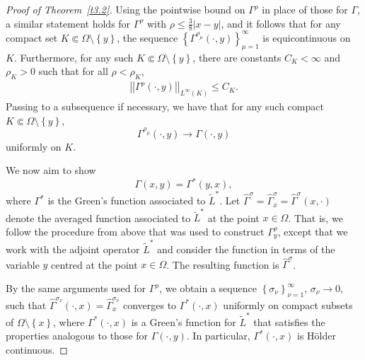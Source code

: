 \documentclass[12pt,reqno]{amsart}
\theoremstyle{plain}
\theoremstyle{definition}
\newenvironment{pf}
{\begin{proof}} {\end{proof}}
\newcommand{\Ga}{\Gamma}
\newcommand{\Om}{\Omega}
\newcommand{\si}{\sigma}
\newcommand{\iny}{\infty}
\newcommand{\norm}[1]{\left\vert \left\vert #1\right\vert\right\vert}
\newcommand{\set}[1]{\left\{#1\right\}}
\newcommand{\pr}[1]{\left( #1 \right) }
\begin{document}
\begin{appendix}
\begin{pf}[Proof of Theorem~\ref{t3.2}]
Using the pointwise bound on $\Ga^\rho$ in place of those for $\Ga$, a similar statement holds for $\Ga^\rho$ with $\rho\leq \frac 38 |x-y|$, and it follows that for any compact set $K \Subset \Om\setminus\set{y}$, the sequence $\set{\Ga^{\rho_\mu}\pr{\cdot, y}}_{\mu = 1}^\iny$ is equicontinuous on $K$.
Furthermore, for any such $K \Subset \Om\setminus\set{y}$, there are constants 
$C_K < \iny$ and $\rho_K > 0$ such that for all $\rho < \rho_K$,
\begin{align*}
\norm{\Ga^{\rho}\pr{\cdot, y}}_{L^\infty\pr{K}} \le C_K.
\end{align*}
Passing to a subsequence if necessary, we have that for any such compact $K 
\Subset \Om\setminus\set{y}$,
\begin{equation}
\Ga^{\rho_\mu}(\cdot, y) \to \Ga\pr{\cdot,  y}
\label{eqB.58}
\end{equation}
uniformly on $K$.

We now aim to show 
\begin{equation*}
\Ga\pr{x,y} = \Ga^*\pr{y,x},
\end{equation*}
where $\Ga^*$ is the Green's function associated to $\widetilde{L}^*$.
Let $\widehat \Ga^{\si}=\widehat \Ga^{\si}_{x} = \widehat \Ga^{\si}\pr{x, \cdot}$ denote the averaged function associated to $\widetilde{L}^*$ at the point $x \in \Om$.
That is, we follow the procedure from above that was used to construct $\Ga^\rho_y$, except that we work with the adjoint operator $\widetilde{L}^*$ and consider the function in terms of the variable $y$ centred at the point $x \in \Om$.
The resulting function is $\widehat \Ga^{\si}$.
  
By the same arguments used for $\Ga^\rho$, we obtain a sequence $\set{\si_{\nu}}_{\nu =1}^\iny$, $\si_\nu \to 0$, such that $\widehat \Ga^{\si_\nu}\pr{\cdot, x}=\widehat \Ga^{\si_\nu}_x$ converges to $\Ga^*\pr{\cdot, x}$ uniformly on compact subsets of $\Om \setminus \set{x}$, where $\Ga^*\pr{\cdot, x}$  is a Green's function for $\widetilde{L}^*$ that satisfies the properties analogous to those for $\Ga\pr{\cdot, y}$.  
In particular, $\Ga^*\pr{\cdot, x}$ is H\"older continuous.


\end{pf}
\end{appendix}
\end{document}
